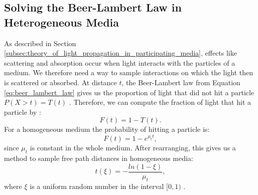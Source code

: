 \subsection{Solving the Beer-Lambert Law in Heterogeneous Media}
\label{subsec:solving_beer_lambert_law_in_heterogeneous_media}
As described in Section \ref{subsec:theory_of_light_propagation_in_participating_media}, effects like scattering and absorption occur when light interacts with the particles of a medium.
We therefore need a way to sample interactions on which the light then is scattered or absorbed.
At distance $t$, the Beer-Lambert law from Equation \ref{eq:beer_lambert_law} gives us the proportion of light that did not hit a particle $P(X > t) = T(t)$ \cite{novak_overview}.
Therefore, we can compute the fraction of light that hit a particle by \cite{novak_overview}:
\begin{equation*}
    F(t) = 1 - T(t).
\end{equation*}
For a homogeneous medium the probability of hitting a particle is:
\begin{equation*}
    F(t) = 1 - e^{\mu_t t},
\end{equation*}
since $\mu_t$ is constant in the whole medium.
After rearranging, this gives us a method to sample free path distances in homogeneous media:
\begin{equation}
    \label{eq:distance_sampling}
    t(\xi) = -\frac{ln(1-\xi)}{\mu_t},
\end{equation}
where $\xi$ is a uniform random number in the interval $[0, 1)$ \cite{novak_overview}.

